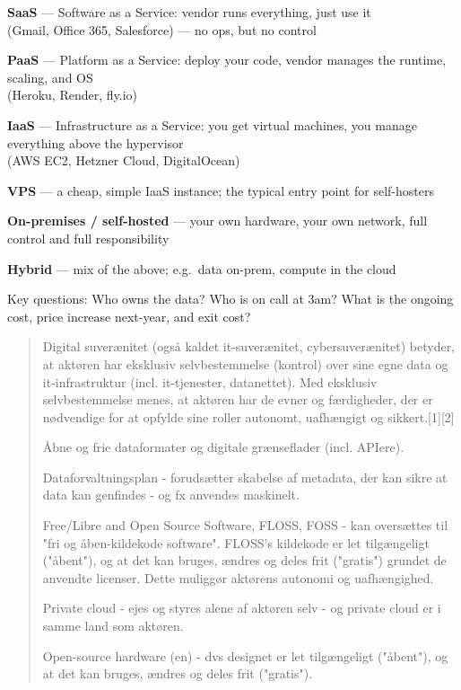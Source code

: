 \documentclass[Screen16to9,17pt]{foils}
\begin{document}
\begin{list2}
\item {\bf SaaS} — Software as a Service: vendor runs everything, just use it\\
(Gmail, Office 365, Salesforce) — no ops, but no control
\item {\bf PaaS} — Platform as a Service: deploy your code, vendor manages
the runtime, scaling, and OS\\ (Heroku, Render, fly.io)
\item {\bf IaaS} — Infrastructure as a Service: you get virtual machines, you manage
everything above the hypervisor\\ (AWS EC2, Hetzner Cloud, DigitalOcean)
\item {\bf VPS} — a cheap, simple IaaS instance; the typical entry point for self-hosters
\item {\bf On-premises / self-hosted} — your own hardware, your own network,
full control and full responsibility
\item {\bf Hybrid} — mix of the above; e.g.\ data on-prem, compute in the cloud
\item Key questions: Who owns the data? Who is on call at 3am? What is the ongoing cost, price increase next-year, and exit cost?
\end{list2}


\begin{quote}
Digital suverænitet (også kaldet it-suverænitet, cybersuverænitet) betyder, at aktøren har eksklusiv selvbestemmelse (kontrol) over sine egne data og it-infrastruktur (incl. it-tjenester, datanettet). Med eksklusiv selvbestemmelse menes, at aktøren har de evner og færdigheder, der er nødvendige for at opfylde sine roller autonomt, uafhængigt og sikkert.[1][2]

\begin{list2}
\item Åbne og frie dataformater og digitale grænseflader (incl. APIere).
\item Dataforvaltningsplan - forudsætter skabelse af metadata, der kan sikre at data kan genfindes - og fx anvendes maskinelt.
\item Free/Libre and Open Source Software, FLOSS, FOSS - kan oversættes til "fri og åben-kildekode software". FLOSS's kildekode er let tilgængeligt ("åbent"), og at det kan bruges, ændres og deles frit ("gratis") grundet de anvendte licenser. Dette muliggør aktørens autonomi og uafhængighed.
\item Private cloud - ejes og styres alene af aktøren selv - og private cloud er i samme land som aktøren.
\item Open-source hardware (en) - dvs designet er let tilgængeligt ("åbent"), og at det kan bruges, ændres og deles frit ("gratis").
\end{list2}
\end{quote}
\end{document}
